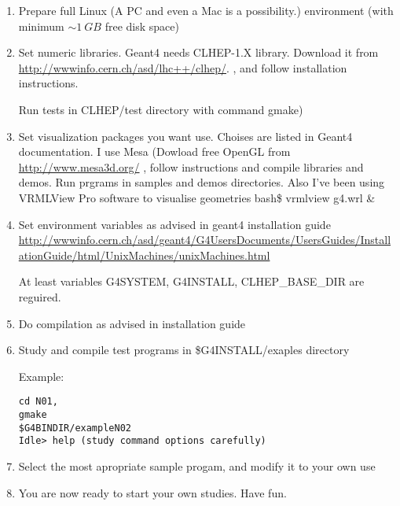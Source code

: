 \begin{enumerate}

\item Prepare full Linux (A PC and even a Mac is a possibility.) environment (with minimum $\sim 1~GB$ free disk space)
 
\item Set numeric libraries. {\sc Geant4} needs CLHEP-1.X library.
Download it from \url{http://wwwinfo.cern.ch/asd/lhc++/clhep/}. , and follow installation instructions. 

Run tests in {\sf CLHEP/test} directory with command {\sf gmake})
 
\item Set visualization packages you want use. Choises are listed in {\sc Geant4} documentation.
I use Mesa (Dowload free OpenGL from \url{http://www.mesa3d.org/} , follow instructions and compile libraries and demos. 
Run prgrams in samples and demos directories. 
Also I've been using VRMLView Pro software to visualise geometries {\sf bash\$ vrmlview g4.wrl \&}
 
\item Set environment variables as advised in geant4 installation guide
\url{http://wwwinfo.cern.ch/asd/geant4/G4UsersDocuments/UsersGuides/InstallationGuide/html/UnixMachines/unixMachines.html}

At least variables {\sf G4SYSTEM, G4INSTALL, CLHEP\_BASE\_DIR} are reguired.
 
\item Do compilation as advised in installation guide
 
\item Study and compile test programs in {\sf \$G4INSTALL/exaples} directory

Example: 
\begin{verbatim}
cd N01, 
gmake
$G4BINDIR/exampleN02
Idle> help (study command options carefully)
\end{verbatim}

\item Select the most apropriate sample progam, and modify it to your own use
\item You are now ready to start your own studies. Have fun. 

 \end{enumerate}                       


